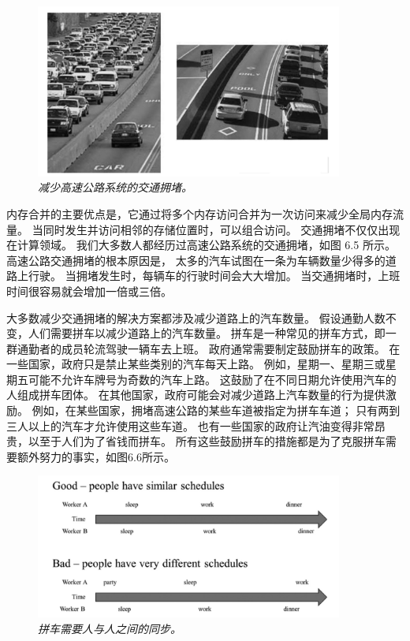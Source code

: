 \begin{figure}[H]
	\centering
	\includegraphics[width=0.9\textwidth]{figs/F6.5.png}
	\caption{\textit{减少高速公路系统的交通拥堵。}}
\end{figure}

内存合并的主要优点是，它通过将多个内存访问合并为一次访问来减少全局内存流量。 
当同时发生并访问相邻的存储位置时，可以组合访问。 交通拥堵不仅仅出现在计算领域。 
我们大多数人都经历过高速公路系统的交通拥堵，如图 6.5 所示。 高速公路交通拥堵的根本原因是，
太多的汽车试图在一条为车辆数量少得多的道路上行驶。 当拥堵发生时，每辆车的行驶时间会大大增加。 
当交通拥堵时，上班时间很容易就会增加一倍或三倍。

大多数减少交通拥堵的解决方案都涉及减少道路上的汽车数量。 假设通勤人数不变，人们需要拼车以减少道路上的汽车数量。 
拼车是一种常见的拼车方式，即一群通勤者的成员轮流驾驶一辆车去上班。 政府通常需要制定鼓励拼车的政策。 
在一些国家，政府只是禁止某些类别的汽车每天上路。 例如，星期一、星期三或星期五可能不允许车牌号为奇数的汽车上路。 
这鼓励了在不同日期允许使用汽车的人组成拼车团体。 在其他国家，政府可能会对减少道路上汽车数量的行为提供激励。 
例如，在某些国家，拥堵高速公路的某些车道被指定为拼车车道； 只有两到三人以上的汽车才允许使用这些车道。 
也有一些国家的政府让汽油变得非常昂贵，以至于人们为了省钱而拼车。 
所有这些鼓励拼车的措施都是为了克服拼车需要额外努力的事实，如图6.6所示。

\begin{figure}[H]
	\centering
	\includegraphics[width=0.9\textwidth]{figs/F6.6.png}
	\caption{\textit{拼车需要人与人之间的同步。}}
\end{figure}

